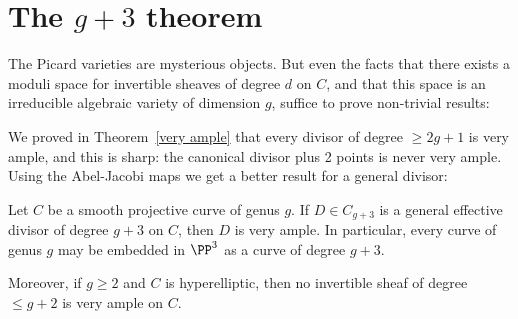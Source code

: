 \section{The $g+3$ theorem}\label{g+3 section}


The Picard varieties are mysterious objects.  But even the facts that there exists a  moduli space for invertible sheaves of degree $d$ on $C$, and that this space is an irreducible algebraic variety of dimension $g$, suffice to prove non-trivial results: 

We proved in Theorem~\ref{very ample} that every divisor of degree $\geq 2g+1$ is very ample, and this is sharp: the canonical divisor plus 2 points is never very ample. Using the Abel-Jacobi maps we get a better result for a general divisor:

\begin{theorem}[$g+3$ theorem]\label{g+3 theorem}
Let $C$ be a smooth projective curve of genus $g$. If $D \in C_{g+3}$ is a general effective divisor of degree $g+3$ on $C$, then 
$D$ is very ample. In particular, every curve of genus $g$ may be embedded in $\PP^{3}$ as a curve of degree $g+3$. 

Moreover, if $g\geq 2$ and $C$ is hyperelliptic, then no invertible sheaf of degree $\leq g+2$ is very ample on $C$.
\end{theorem}

